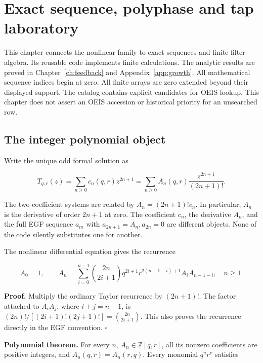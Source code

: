 \hypertarget{exact-sequence-polyphase-and-tap-laboratory}{%
\chapter[Sequence and polyphase laboratory]{Exact sequence, polyphase and tap
laboratory}\label{app:sequence}\label{exact-sequence-polyphase-and-tap-laboratory}}



This chapter connects the nonlinear family to exact sequences and finite
filter algebra. Its reusable code implements finite calculations. The
analytic results are proved in Chapter~\ref{ch:feedback} and
Appendix~\ref{app:growth}. All mathematical
sequence indices begin at zero. All finite arrays are zero extended
beyond their displayed support. The catalog contains explicit candidates
for OEIS lookup. This chapter does not assert an OEIS accession or
historical priority for an unsearched row.

\hypertarget{the-integer-polynomial-object}{%
\section{The integer polynomial
object}\label{the-integer-polynomial-object}}

Write the unique odd formal solution as

\[
T_{q,r}(z)=\sum_{n\ge0}c_n(q,r)z^{2n+1}
          =\sum_{n\ge0}A_n(q,r)\frac{z^{2n+1}}{(2n+1)!}.
\]

The two coefficient systems are related by \(A_n=(2n+1)!c_n\). In
particular, \(A_n\) is the derivative of order \(2n+1\) at zero. The
coefficient \(c_n\), the derivative \(A_n\), and the full EGF sequence
\(a_m\) with \(a_{2n+1}=A_n, a_{2n}=0\) are different objects. None of
the code silently substitutes one for another.

The nonlinear differential equation gives the recurrence

\[
\boxed{
A_0=1,\qquad
A_n=\sum_{i=0}^{n-1}\binom{2n}{2i+1}
 q^{2i+1}r^{2(n-1-i)+1}A_i A_{n-1-i},\quad n\ge1.}
\]

\textbf{Proof.} Multiply the ordinary Taylor recurrence by \((2n+1)!\).
The factor attached to \(A_iA_j\), where \(i+j=n-1\), is
\((2n)!/[(2i+1)!(2j+1)!]=\binom{2n}{2i+1}\). This also proves the
recurrence directly in the EGF convention. \(\square\)

\textbf{Polynomial theorem.} For every \(n\), \(A_n\in\mathbb Z[q,r]\),
all its nonzero coefficients are positive integers, and
\(A_n(q,r)=A_n(r,q)\). Every monomial \(q^u r^v\) satisfies

